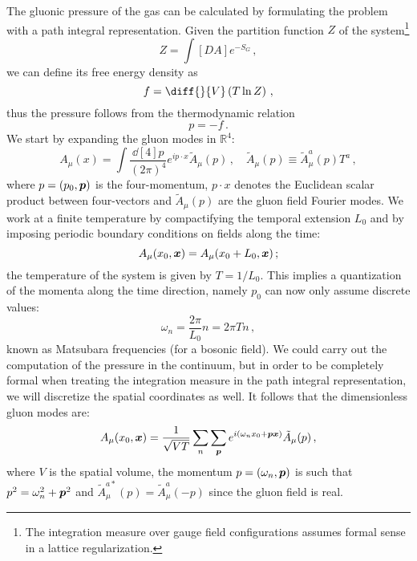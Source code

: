 \documentclass{article}
\begin{document}
The gluonic pressure of the gas can be calculated by formulating the problem with a path integral representation.
Given the partition function $Z$ of the system\footnote{The integration measure over gauge field configurations assumes formal sense in a lattice regularization.}
\begin{equation}\label{eq: Z}
    Z = \int \left[ DA \right] e^{-S_G} \, ,
\end{equation}
we can define its free energy density as
\begin{equation}
    f = \diff{}{V}\left(T \ln Z \right) \, ,
\end{equation}
thus the pressure follows from the thermodynamic relation
\begin{equation}
    p = -f \, .
\end{equation}
We start by expanding the gluon modes in $\mathbb{R}^4$:
\begin{equation}
    A_\mu (x) = \int \frac{\dd[4]{p}}{(2\pi)^4} e^{i p \cdot x} \tilde{A}_\mu (p) \, , \quad \tilde{A}_\mu (p) \equiv \tilde{A}_\mu^a (p) T^a \, ,
\end{equation}
where $p = (p_0, \vb*{p})$ is the four-momentum, $p \cdot x$ denotes the Euclidean scalar product between four-vectors and $\tilde{A}_\mu (p)$ are the gluon field Fourier modes.
We work at a finite temperature by compactifying the temporal extension $L_0$ and by imposing periodic boundary conditions on fields along the time:
\begin{equation}
    A_\mu (x_0, \vb*{x}) = A_\mu (x_0 + L_0, \vb*{x}) \, ;
\end{equation}
the temperature of the system is given by $T = 1/L_0$.
This implies a quantization of the momenta along the time direction, namely $p_0$ can now only assume discrete values:
\begin{equation}
    \omega_n = \frac{2\pi}{L_0} n = 2\pi T n \, ,
\end{equation}
known as Matsubara frequencies (for a bosonic field). We could carry out the computation of the pressure in the continuum, but in order 
to be completely formal when treating the integration measure in the path integral representation, we will discretize the 
spatial coordinates as well. It follows that the dimensionless gluon modes are:
\begin{equation}\label{eq: modes}
    A_\mu (x_0, \vb*{x}) = \frac{1}{\sqrt{VT}} \sum_n \sum_{\vb*{p}} e^{i(\omega_n x_0 + \vb*{p} \vb*{x})} \tilde{A}_\mu (p) \, , 
\end{equation} 
where $V$ is the spatial volume, the momentum $p = (\omega_n, \vb*{p})$ is such that $p^2 = \omega_n^2 + \vb*{p}^2$ and $\tilde{A}_\mu^{a*} (p) = \tilde{A}_\mu^a (-p)$ since the gluon field is real.
\end{document}
